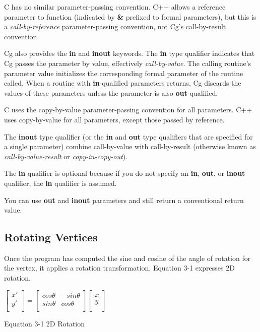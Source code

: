 \documentclass[../main.tex]{subfiles}
\begin{document}
C has no similar parameter-passing convention. C++ allows a reference parameter to function (indicated by \textbf{\&} prefixed to formal parameters), but this is a \textit{call-by-reference} parameter-passing convention, not Cg's call-by-result convention.

Cg also provides the \textbf{in} and \textbf{inout} keywords. The \textbf{in} type qualifier indicates that Cg passes the parameter by value, effectively \textit{call-by-value}. The calling routine's parameter value initializes the corresponding formal parameter of the routine called. When a routine with \textbf{in}-qualified parameters returns, Cg discards the values of these parameters unless the parameter is also \textbf{out}-qualified.

C uses the copy-by-value parameter-passing convention for all parameters. C++ uses copy-by-value for all parameters, except those passed by reference.

The \textbf{inout} type qualifier (or the \textbf{in} and \textbf{out} type qualifiers that are specified for a single parameter) combine call-by-value with call-by-result (otherwise known as \textit{call-by-value-result} or \textit{copy-in-copy-out}).

The \textbf{in} qualifier is optional because if you do not specify an \textbf{in}, \textbf{out}, or \textbf{inout} qualifier, the \textbf{in} qualifier is assumed.

You can use \textbf{out} and \textbf{inout} parameters and still return a conventional return value.

\subsection*{Rotating Vertices}

Once the program has computed the sine and cosine of the angle of rotation for the vertex, it applies a rotation transformation. Equation 3-1 expresses 2D rotation.

\FloatBarrier
\begin{equationcaption}
\centering
$
\begin{bmatrix}
x' \\
y' \\
\end{bmatrix}
= 
\begin{bmatrix}
cos \theta & -sin \theta \\
sin \theta & cos \theta \\
\end{bmatrix}
\begin{bmatrix}
x \\
y \\
\end{bmatrix}
$
\caption{Equation 3-1 2D Rotation}
\end{equationcaption}
\FloatBarrier
\end{document}
